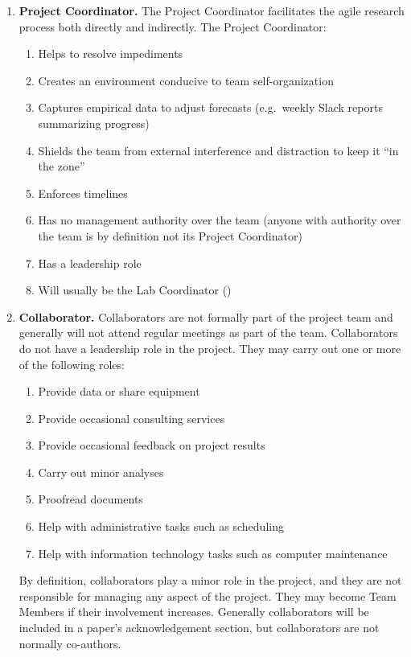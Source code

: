 \documentclass{tufte-book} %
\begin{document}
\begin{enumerate}
\item \textbf{Project Coordinator.} The Project Coordinator facilitates
  the agile research process both directly and indirectly. The Project Coordinator:
\begin{enumerate}
\item Helps to resolve impediments
\item Creates an environment conducive to team self-organization
\item Captures empirical data to adjust forecasts (e.g.\ weekly Slack
  reports summarizing progress)
\item Shields the team from external interference and distraction to
  keep it ``in the zone''
\item Enforces timelines
\item Has no management authority over the team (anyone with authority
  over the team is by definition not its Project
  Coordinator)
\item Has a leadership role
\item Will usually be the Lab Coordinator (\href{mailto:contextualdynamics@gmail.com}{\coordinator})
\end{enumerate}

\item \textbf{Collaborator.}  Collaborators are not formally part of
  the project team and generally will not attend regular meetings as
  part of the team.  Collaborators do not have a leadership role in
  the project.  They may carry out one or more of the
  following roles:
\begin{enumerate}
\item Provide data or share equipment
\item Provide occasional consulting services
\item Provide occasional feedback on project results
\item Carry out minor analyses
\item Proofread documents
\item Help with administrative tasks such as scheduling
\item Help with information technology tasks such as computer
  maintenance

\end{enumerate}
By definition, collaborators play a minor role in the project, and they are not
responsible for managing any aspect of the project.  They may become Team
Members if their involvement increases.  Generally collaborators will
be included in a paper's acknowledgement section, but collaborators
are not normally co-authors.
\end{enumerate}
\end{document}
